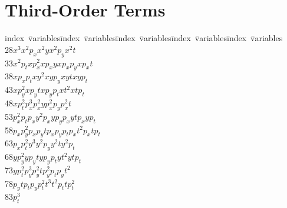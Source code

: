 \section{Third-Order Terms}
\indent
\begin{tabbing}
index\ \=variables\kern1cm\=index\ \=variables\kern1cm\=
index\ \=variables\kern1cm\=index\ \=variables\kern1cm\=
index\ \=variables\\
 28\>$x  ^3             $\>$x  ^2 p_x         $\>$x  ^2 y           $\>$x  ^2 p_y         $\>$x  ^2 t           $\\
 33\>$x  ^2 p_t         $\>$x  p_x^2          $\>$x  p_xy           $\>$x  p_xp_y         $\>$x  p_xt           $\\
 38\>$x  p_xp_t         $\>$x  y  ^2          $\>$x  y  p_y         $\>$x  y  t           $\>$x  y  p_t         $\\
 43\>$x  p_y^2          $\>$x  p_yt           $\>$x  p_yp_t         $\>$x  t  ^2          $\>$x  t  p_t         $\\
 48\>$x  p_t^2          $\>$p_x^3             $\>$p_x^2 y           $\>$p_x^2 p_y         $\>$p_x^2 t           $\\
 53\>$p_x^2 p_t         $\>$p_xy  ^2          $\>$p_xy  p_y         $\>$p_xy  t           $\>$p_xy  p_t         $\\
 58\>$p_xp_y^2          $\>$p_xp_yt           $\>$p_xp_yp_t         $\>$p_xt  ^2          $\>$p_xt  p_t         $\\
 63\>$p_xp_t^2          $\>$y  ^3             $\>$y  ^2 p_y         $\>$y  ^2 t           $\>$y  ^2 p_t         $\\
 68\>$y  p_y^2          $\>$y  p_yt           $\>$y  p_yp_t         $\>$y  t  ^2          $\>$y  t  p_t         $\\
 73\>$y  p_t^2          $\>$p_y^3             $\>$p_y^2 t           $\>$p_y^2 p_t         $\>$p_yt  ^2          $\\
 78\>$p_yt  p_t         $\>$p_yp_t^2          $\>$t  ^3             $\>$t  ^2 p_t         $\>$t  p_t^2          $\\
 83\>$p_t^3             $
\end{tabbing}

